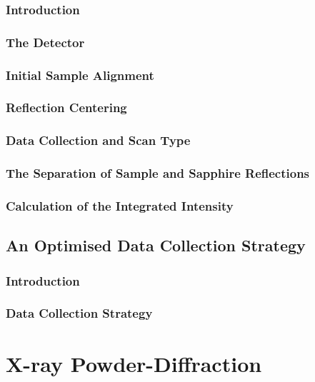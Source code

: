 \subsubsection{Introduction}

\subsubsection{The Detector}

\subsubsection{Initial Sample Alignment}

\subsubsection{Reflection Centering}

\subsubsection{Data Collection and Scan Type}

\subsubsection{The Separation of Sample and Sapphire Reflections}

\subsubsection{Calculation of the Integrated Intensity}

\subsection{An Optimised Data Collection Strategy}

\subsubsection{Introduction}

\subsubsection{Data Collection Strategy}

\section{X-ray Powder-Diffraction}

